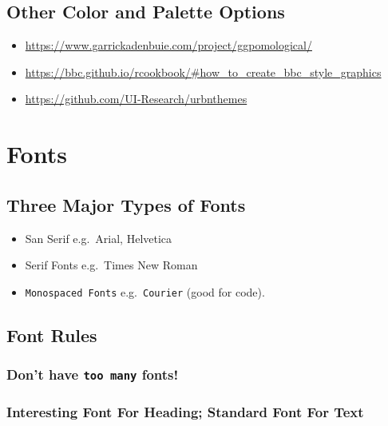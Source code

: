 \documentclass[
]{article}
\providecommand{\tightlist}{%
  \setlength{\itemsep}{0pt}\setlength{\parskip}{0pt}}
\begin{document}
\hypertarget{other-color-and-palette-options}{%
\subsection{Other Color and Palette
Options}\label{other-color-and-palette-options}}

\begin{itemize}
\tightlist
\item
  \url{https://www.garrickadenbuie.com/project/ggpomological/}
\item
  \url{https://bbc.github.io/rcookbook/\#how_to_create_bbc_style_graphics}
\item
  \url{https://github.com/UI-Research/urbnthemes}
\end{itemize}

\hypertarget{fonts}{%
\section{Fonts}\label{fonts}}

\hypertarget{three-major-types-of-fonts}{%
\subsection{Three Major Types of
Fonts}\label{three-major-types-of-fonts}}

\begin{itemize}
\tightlist
\item
  San Serif e.g.~Arial, Helvetica
\item
  Serif Fonts e.g.~Times New Roman
\item
  \texttt{Monospaced\ Fonts} e.g.~\texttt{Courier} (good for code).
\end{itemize}

\hypertarget{font-rules}{%
\subsection{Font Rules}\label{font-rules}}

\hypertarget{dont-have-too-many-fonts}{%
\subsubsection{\texorpdfstring{Don't have \texttt{too\ many}
fonts!}{Don't have too many fonts!}}\label{dont-have-too-many-fonts}}

\hypertarget{interesting-font-for-heading-standard-font-for-text}{%
\subsubsection{Interesting Font For Heading; Standard Font For
Text}\label{interesting-font-for-heading-standard-font-for-text}}
\end{document}
